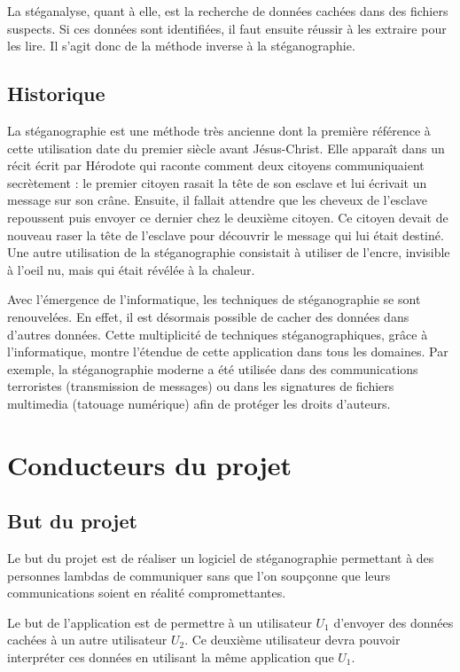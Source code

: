 \documentclass[11pt]{article}
\begin{document}
La stéganalyse, quant à elle, est la recherche de données cachées dans des fichiers suspects. Si ces données sont identifiées, il faut ensuite réussir à les
extraire pour les lire. Il s'agit donc de la méthode inverse à la stéganographie. 

\subsection{Historique}
La stéganographie est une méthode très ancienne dont la première référence à cette utilisation date du premier siècle avant Jésus-Christ. 
Elle apparaît dans un récit écrit par Hérodote qui raconte comment deux citoyens communiquaient secrètement : 
le premier citoyen rasait la tête de son esclave et lui écrivait un message sur son crâne. Ensuite, il fallait attendre que les cheveux de l'esclave repoussent puis envoyer ce dernier chez le deuxième citoyen. 
Ce citoyen devait de nouveau raser la tête de l'esclave pour découvrir le message qui lui était destiné. 
Une autre utilisation de la stéganographie consistait à utiliser de l'encre, invisible à l'oeil nu, mais qui était révélée à la chaleur. 

Avec l'émergence de l'informatique, les techniques de stéganographie se sont renouvelées. En effet, il est désormais possible de cacher des données dans d'autres données. 
Cette multiplicité de techniques stéganographiques, grâce à l'informatique, montre l'étendue de cette application dans tous les domaines. 
Par exemple, la stéganographie moderne a été utilisée dans des communications terroristes (transmission de messages) ou dans les signatures de fichiers multimedia (tatouage numérique) afin de protéger les droits d'auteurs. 

\section{Conducteurs du projet}

\subsection{But du projet}
Le but du projet est de réaliser un logiciel de stéganographie permettant à des personnes lambdas de communiquer sans que l'on soupçonne que leurs communications soient en réalité compromettantes. 

Le but de l'application est de permettre à un utilisateur $U_1$ d'envoyer des données cachées à un autre utilisateur $U_2$. Ce deuxième utilisateur devra pouvoir interpréter ces données en utilisant la même application que $U_1$. 
\end{document}
